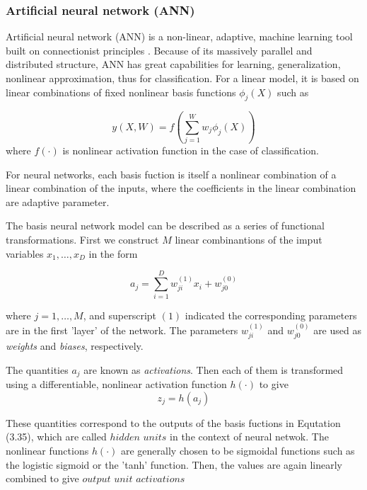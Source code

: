 \subsubsection{Artificial neural network (ANN)}
Artificial neural network (ANN) is a non-linear, adaptive, machine learning tool built on connectionist principles \citep{lek1999artificial, samarasinghe2006neural}. Because of its massively parallel and distributed structure, ANN has great capabilities for learning, generalization, nonlinear approximation, thus for classification. For a linear model, it is based on linear combinations of fixed nonlinear basis functions $\phi_{j}(X)$ such as

\begin{equation}
y(X,W)=f(\sum_{j=1}^{W}w_{j} \phi_{j}(X))
\end{equation}
where $f(\cdot)$ is nonlinear activation function in the case of classification.

For neural networks, each basis fuction is itself a nonlinear combination of a linear combination of the inputs, where the coefficients in the linear combination are adaptive parameter.

The basis neural network model can be described as a series of functional transformations. First we construct $M$ linear combinantions of the imput variables $x_{1},\ldots , x_{D}$ in the form


\begin{equation}
a_{j}=\sum_{i=1}^{D}w_{ji}^{(1)}x_{i}+w_{j0}^{(0)}
\end{equation}

where $j=1, \ldots ,M$, and superscript $(1)$ indicated the corresponding parameters are in the first 'layer' of the network. The parameters $w_{ji}^{(1)}$ and $w_{j0}^{(0)}$ are used as \textit{weights} and \textit{biases}, respectively. 

The quantities $a_{j}$ are known as \textit{activations}. Then each of them is transformed using a differentiable, nonlinear activation function $h(\cdot)$ to give
\begin{equation}
z_{j}=h(a_{j})
\end{equation}

These quantities correspond to the outputs of the basis fuctions in Equtation (3.35), which are called $hidden$ $units$ in the context of neural netwok.
The nonlinear functions $h(\cdot)$ are generally chosen to be sigmoidal functions such as the logistic sigmoid or the 'tanh' function. Then, the values are again linearly combined to give $output$ $unit$ $activations$

